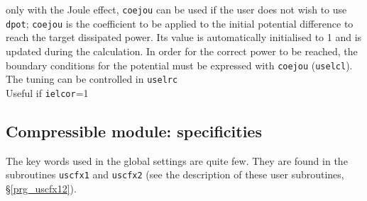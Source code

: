 {only with the Joule effect, \texttt{coejou} can be used if the user does not
wish to use \texttt{dpot}; \texttt{coejou} is the coefficient to be applied
to the initial potential difference to reach the target dissipated power.
Its value is automatically initialised to 1 and is updated during the
calculation. In order for the correct power to be reached, the boundary
conditions for the potential must be expressed with \texttt{coejou}
(\texttt{uselcl}). The tuning can be controlled in \texttt{uselrc}\\
Useful if \texttt{ielcor}=1}

\subsection{Compressible module: specificities}

The key words used in the global settings are quite few. They are
found in the subroutines \texttt{uscfx1} and \texttt{uscfx2} (see the
description of these user subroutines, \S\ref{prg_uscfx12}).

